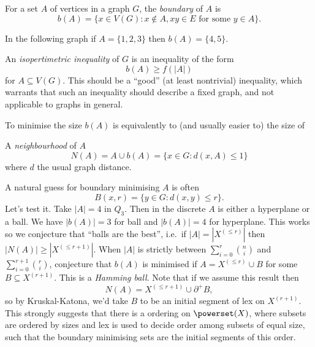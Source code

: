 \documentclass[a4paper]{article}
\newcommand{\shadow}{\partial}
\begin{document}
\begin{definition}[boundary]
  For a set \(A\) of vertices in a graph \(G\), the \emph{boundary} of \(A\) is
  \[
    b(A) = \{x \in V(G): x \notin A, xy \in E \text{ for some } y \in A\}.
  \]
\end{definition}

\begin{eg}
  In the following graph if \(A = \{1, 2, 3\}\) then \(b(A) = \{4, 5\}\).
  \begin{center}
  \end{center}
\end{eg}

An \emph{isopertimetric inequality} of \(G\) is an inequality of the form
\[
  b(A) \geq f(|A|)
\]
for \(A \subseteq V(G)\). This should be a ``good'' (at least nontrivial) inequality, which warrants that such an inequality should describe a fixed graph, and not applicable to graphs in general.

To minimise the size \(b(A)\) is equivalently to (and usually easier to) the size of

\begin{definition}[neighbourhood]
  A \emph{neighbourhood} of \(A\)
  \[
    N(A) = A \cup b(A) = \{x \in G: d(x, A) \leq 1\}
  \]
  where \(d\) the usual graph distance.
\end{definition}

A natural guess for boundary minimising \(A\) is often
\[
  B(x, r) = \{y \in G: d(x, y) \leq r\}.
\]
Let's test it. Take \(|A| = 4\) in \(Q_3\). Then in the discrete \(A\) is either a hyperplane or a ball. We have \(|b(A)| = 3\) for ball and \(|b(A)| = 4\) for hyperplane. This works so we conjecture that ``balls are the best'', i.e.\ if \(|A| = |X^{(\leq r)}|\) then \(|N(A)| \geq |X^{(\leq r + 1)}|\). When \(|A|\) is strictly between \(\sum_{i = 0}^r \binom{n}{i}\) and \(\sum_{i = 0}^{r + 1} \binom{r}{i}\), conjecture that \(b(A)\) is minimised if \(A = X^{(\leq r)} \cup B\) for some \(B \subseteq X^{(r + 1)}\). This is a \emph{Hamming ball}. Note that if we assume this result then
\[
  N(A) = X^{(\leq r + 1)} \cup \shadow^+ B,
\]
so by Kruskal-Katona, we'd take \(B\) to be an initial segment of lex on \(X^{(r + 1)}\). This strongly suggests that there is a ordering on \(\powerset(X)\), where subsets are ordered by sizes and lex is used to decide order among subsets of equal size, such that the boundary minimising sets are the initial segments of this order.
\end{document}
